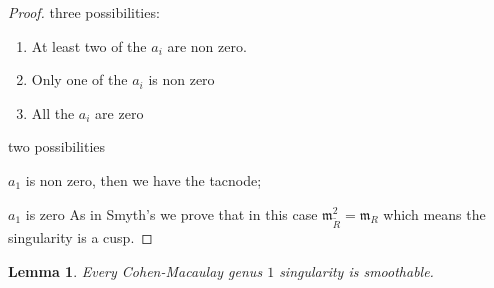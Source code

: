 \documentclass[11pt]{amsart}
\theoremstyle{plain}
\newtheorem{lem}[thm]{Lemma}
\theoremstyle{definition}
\begin{document}
\begin{proof}
 three possibilities:
\begin{enumerate}
\item At least two of the $a_i$ are non zero.
\item Only one of the $a_i$ is non zero
\item All the $a_i$ are zero
\end{enumerate}
 two possibilities
\item $a_1$ is non zero, then we have the tacnode;
\item  $a_1$ is zero
 As in Smyth's we prove that in this  case $\mathfrak{m}^2_{\widetilde{R}}=\mathfrak{m}_{R}$ which means the singularity is a cusp. 
\end{proof}
\begin{lem}
Every Cohen-Macaulay genus $1$ singularity is smoothable.
\end{lem}
\end{document}
